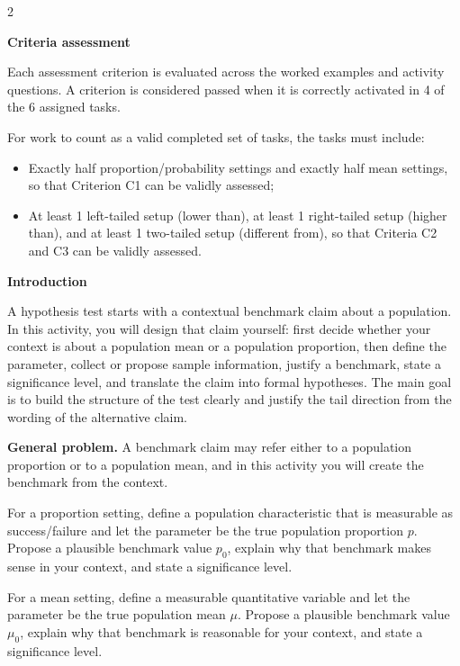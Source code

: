 \documentclass[12pt]{article}
\newcommand{\SubsectionBox}[1]{%
\noindent\colorbox{gray!30}{%
\parbox{\linewidth}{\textbf{#1}}%
}\par\vspace{0.35cm}%
}
\begin{document}
\begin{multicols}{2}
\SubsectionBox{Criteria assessment}\vspace{-0.25cm}
Each assessment criterion is evaluated across the worked examples and activity questions. A criterion is considered passed when it is correctly activated in 4 of the 6 assigned tasks.

For work to count as a valid completed set of tasks, the tasks must include:
\begin{itemize}
	\item Exactly half proportion/probability settings and exactly half mean settings, so that Criterion C1 can be validly assessed;
	\item At least 1 left-tailed setup (lower than), at least 1 right-tailed setup (higher than), and at least 1 two-tailed setup (different from), so that Criteria C2 and C3 can be validly assessed.
\end{itemize}


\vspace{0.15cm}
\SubsectionBox{Introduction}\vspace{-0.25cm}
A hypothesis test starts with a contextual benchmark claim about a population. In this activity, you will design that claim yourself: first decide whether your context is about a population mean or a population proportion, then define the parameter, collect or propose sample information, justify a benchmark, state a significance level, and translate the claim into formal hypotheses. The main goal is to build the structure of the test clearly and justify the tail direction from the wording of the alternative claim.

\vspace{0.2cm}
\textbf{General problem.}
A benchmark claim may refer either to a population proportion or to a population mean, and in this activity you will create the benchmark from the context.

For a proportion setting, define a population characteristic that is measurable as success/failure and let the parameter be the true population proportion \(p\). Propose a plausible benchmark value \(p_0\), explain why that benchmark makes sense in your context, and state a significance level.

For a mean setting, define a measurable quantitative variable and let the parameter be the true population mean \(\mu\). Propose a plausible benchmark value \(\mu_0\), explain why that benchmark is reasonable for your context, and state a significance level.


\end{multicols}
\end{document}
